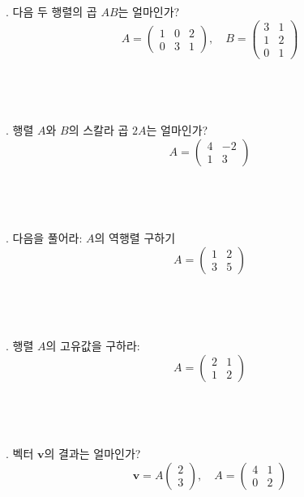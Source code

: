 \documentclass[fleqn]{article}
\begin{document}
. 다음 두 행렬의 곱 \(AB\)는 얼마인가?  
\[
A = \begin{pmatrix} 1 & 0 & 2 \\ 0 & 3 & 1 \end{pmatrix}, \quad B = \begin{pmatrix} 3 & 1 \\ 1 & 2 \\ 0 & 1 \end{pmatrix}
\]\\\\\\\\

. 행렬 \(A\)와 \(B\)의 스칼라 곱 \(2A\)는 얼마인가?  
\[
A = \begin{pmatrix} 4 & -2 \\ 1 & 3 \end{pmatrix}
\]\\\\\\\\

. 다음을 풀어라: \(A\)의 역행렬 구하기  
\[
A = \begin{pmatrix} 1 & 2 \\ 3 & 5 \end{pmatrix}
\]\\\\\\\\

. 행렬 \(A\)의 고유값을 구하라:  
\[
A = \begin{pmatrix} 2 & 1 \\ 1 & 2 \end{pmatrix}
\]\\\\\\\\

. 벡터 \(\mathbf{v}\)의 결과는 얼마인가?  
\[
\mathbf{v} = A \begin{pmatrix} 2 \\ 3 \end{pmatrix}, \quad A = \begin{pmatrix} 4 & 1 \\ 0 & 2 \end{pmatrix}
\]\\\\\\\\
\end{document}
